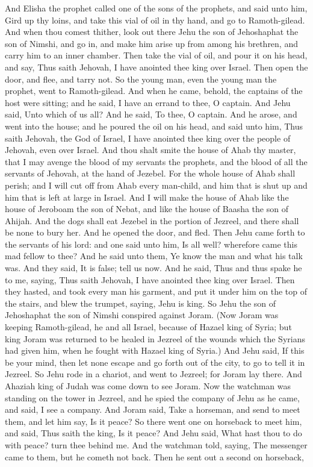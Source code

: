 And Elisha the prophet called one of the sons of the prophets, and said unto him, Gird up thy loins, and take this vial of oil in thy hand, and go to Ramoth-gilead. And when thou comest thither, look out there Jehu the son of Jehoshaphat the son of Nimshi, and go in, and make him arise up from among his brethren, and carry him to an inner chamber. Then take the vial of oil, and pour it on his head, and say, Thus saith Jehovah, I have anointed thee king over Israel. Then open the door, and flee, and tarry not. So the young man, even the young man the prophet, went to Ramoth-gilead. And when he came, behold, the captains of the host were sitting; and he said, I have an errand to thee, O captain. And Jehu said, Unto which of us all? And he said, To thee, O captain. And he arose, and went into the house; and he poured the oil on his head, and said unto him, Thus saith Jehovah, the God of Israel, I have anointed thee king over the people of Jehovah, even over Israel. And thou shalt smite the house of Ahab thy master, that I may avenge the blood of my servants the prophets, and the blood of all the servants of Jehovah, at the hand of Jezebel. For the whole house of Ahab shall perish; and I will cut off from Ahab every man-child, and him that is shut up and him that is left at large in Israel. And I will make the house of Ahab like the house of Jeroboam the son of Nebat, and like the house of Baasha the son of Ahijah. And the dogs shall eat Jezebel in the portion of Jezreel, and there shall be none to bury her. And he opened the door, and fled.  Then Jehu came forth to the servants of his lord: and one said unto him, Is all well? wherefore came this mad fellow to thee? And he said unto them, Ye know the man and what his talk was. And they said, It is false; tell us now. And he said, Thus and thus spake he to me, saying, Thus saith Jehovah, I have anointed thee king over Israel. Then they hasted, and took every man his garment, and put it under him on the top of the stairs, and blew the trumpet, saying, Jehu is king.  So Jehu the son of Jehoshaphat the son of Nimshi conspired against Joram. (Now Joram was keeping Ramoth-gilead, he and all Israel, because of Hazael king of Syria; but king Joram was returned to be healed in Jezreel of the wounds which the Syrians had given him, when he fought with Hazael king of Syria.) And Jehu said, If this be your mind, then let none escape and go forth out of the city, to go to tell it in Jezreel. So Jehu rode in a chariot, and went to Jezreel; for Joram lay there. And Ahaziah king of Judah was come down to see Joram.  Now the watchman was standing on the tower in Jezreel, and he spied the company of Jehu as he came, and said, I see a company. And Joram said, Take a horseman, and send to meet them, and let him say, Is it peace? So there went one on horseback to meet him, and said, Thus saith the king, Is it peace? And Jehu said, What hast thou to do with peace? turn thee behind me. And the watchman told, saying, The messenger came to them, but he cometh not back. Then he sent out a second on horseback, 